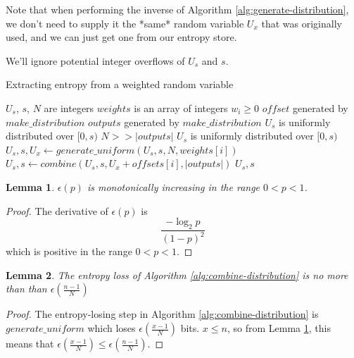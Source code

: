 \documentclass[12pt]{article}
\newtheorem{lemma}{Lemma}
\begin{document}
Note that when performing the inverse of Algorithm \ref{alg:generate-distribution}, we don't need to supply it the *same* random variable $U_x$ that was originally used, and we can just get one from our entropy store.

We'll ignore potential integer overflows of $U_s$ and $s$.

\begin{algorithm}
\caption{Extracting entropy from a weighted random variable}
\label{alg:combine-distribution}
\begin{algorithmic}[1]
\Require $U_s$, $s$, $N$ are integers
\Require $weights$ is an array of integers $w_i \ge 0$
\Require $offset$ generated by $make\_distribution$ 
\Require $outputs$ generated by $make\_distribution$
\Require $U_s$ is uniformly distributed over $[0,s)$
\Require $N >> |outputs|$
\Ensure $U_s$ is uniformly distributed over $[0,s)$
    \State $U_s, s, U_x \gets generate\_uniform(U_s, s, N, weights[i])$
    \State $U_s, s \gets combine(U_s, s, U_x + offsets[i], |outputs|)$
    \State \Return $U_s, s$
\EndProcedure
\end{algorithmic}
\end{algorithm}



\begin{lemma}
    \label{lem:hloss_monotonic}
    $\epsilon(p)$ is monotonically increasing in the range $0 < p < 1$.
\end{lemma}

\begin{proof}The derivative of $\epsilon(p)$ is
    \begin{equation}
        \frac{-\log_2p}{(1-p)^2}
    \end{equation}
    which is positive in the range $0 < p < 1$.
\end{proof}

\begin{lemma}
The entropy loss of Algorithm \ref{alg:combine-distribution} is no more than than $\epsilon(\frac{n-1}{N})$
\end{lemma}

\begin{proof}
    The entropy-losing step in Algorithm \ref{alg:combine-distribution} is $generate\_uniform$ which loses $\epsilon(\frac{x-1}{N})$ bits. $x \le n$, so from Lemma \ref{lem:hloss_monotonic}, this means that $\epsilon(\frac{x-1}{N}) \le \epsilon(\frac{n-1}{N})$.
\end{proof}
\end{document}
